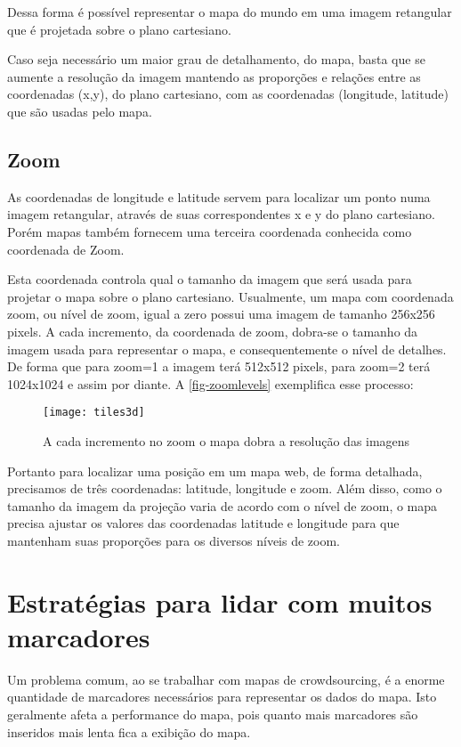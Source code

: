 	Dessa forma é possível representar o mapa do mundo em uma imagem retangular que é projetada sobre o plano cartesiano.
	
	Caso seja necessário um maior grau de detalhamento, do mapa, basta que se aumente a resolução da imagem mantendo as proporções e relações entre as coordenadas (x,y), do plano cartesiano, com as coordenadas (longitude, latitude) que são usadas pelo mapa.
		
	\subsection{Zoom}
	As coordenadas de longitude e latitude servem para localizar um ponto numa imagem retangular, através de suas correspondentes x e y do plano cartesiano. Porém mapas também fornecem uma terceira coordenada conhecida como coordenada de Zoom.
	
	 Esta  coordenada controla qual o tamanho da imagem que será usada para projetar o mapa sobre o plano cartesiano. Usualmente, um mapa com coordenada zoom, ou nível de zoom, igual a zero possui uma imagem de tamanho 256x256 pixels. A cada incremento, da coordenada de zoom, dobra-se o tamanho da imagem usada para representar o mapa, e consequentemente o nível de detalhes. De forma que  para zoom=1 a imagem terá 512x512 pixels, para zoom=2 terá 1024x1024 e assim por diante. A \autoref{fig-zoomlevels} exemplifica esse processo:
	\begin{figure}[htb]
	\caption{\label{fig-zoomlevels} A cada incremento no zoom o mapa dobra a resolução das imagens}
	\begin{center}
	    \texttt{[image: tiles3d]}
	\end{center}
	\end{figure}

	Portanto para localizar uma posição  em um mapa web, de forma detalhada, precisamos de três coordenadas: latitude, longitude e zoom. Além disso, como o tamanho da imagem da projeção varia de acordo com o nível de zoom, o mapa precisa ajustar os valores das coordenadas latitude e longitude para que mantenham suas proporções para os diversos níveis de zoom.

\section{Estratégias para lidar com muitos marcadores\label{sec-estrategias}}
	Um problema comum, ao se trabalhar com mapas de crowdsourcing, é a enorme quantidade de marcadores necessários para representar os dados do mapa. Isto geralmente afeta a performance do mapa, pois quanto mais marcadores são inseridos mais lenta fica a exibição do mapa. 
	
